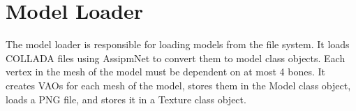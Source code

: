 \section{Model Loader}\label{model_loader}

The model loader is responsible for loading models from the file system.
It loads COLLADA files using AssipmNet to convert them to model class objects.
Each vertex in the mesh of the model must be dependent on at most 4 bones.
It creates VAOs for each mesh of the model, stores them in the Model class object, loads a PNG file, and stores it in a Texture class object.
